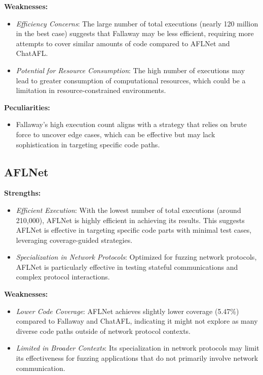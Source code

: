 \textbf{Weaknesses:}
\begin{itemize}
    \item \textit{Efficiency Concerns}: The large number of total executions (nearly 120 million in the best case) suggests that Fallaway may be less efficient, requiring more attempts to cover similar amounts of code compared to AFLNet and ChatAFL.
    \item \textit{Potential for Resource Consumption}: The high number of executions may lead to greater consumption of computational resources, which could be a limitation in resource-constrained environments.
\end{itemize}

\textbf{Peculiarities:}
\begin{itemize}
    \item Fallaway’s high execution count aligns with a strategy that relies on brute force to uncover edge cases, which can be effective but may lack sophistication in targeting specific code paths.
\end{itemize}

\subsection{AFLNet}

\textbf{Strengths:}
\begin{itemize}
    \item \textit{Efficient Execution}: With the lowest number of total executions (around 210,000), AFLNet is highly efficient in achieving its results. This suggests AFLNet is effective in targeting specific code parts with minimal test cases, leveraging coverage-guided strategies.
    \item \textit{Specialization in Network Protocols}: Optimized for fuzzing network protocols, AFLNet is particularly effective in testing stateful communications and complex protocol interactions.
\end{itemize}

\textbf{Weaknesses:}
\begin{itemize}
    \item \textit{Lower Code Coverage}: AFLNet achieves slightly lower coverage (5.47\%) compared to Fallaway and ChatAFL, indicating it might not explore as many diverse code paths outside of network protocol contexts.
    \item \textit{Limited in Broader Contexts}: Its specialization in network protocols may limit its effectiveness for fuzzing applications that do not primarily involve network communication.
\end{itemize}

